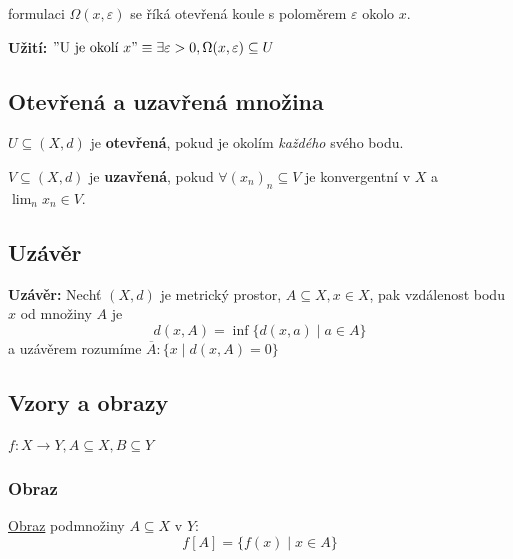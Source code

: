 \documentclass[../main.tex]{subfiles}
\begin{document}
formulaci $\Omega (x,\varepsilon)$ se říká otevřená koule s poloměrem $\varepsilon$ okolo $x$.
\vspace{5mm}

\noindent
\hspace{1.2mm}
\textbf{Užití:}
$"\textrm{U je okolí } x" \equiv \exists \varepsilon > 0, \Omega (x,\varepsilon) \subseteq U $

\subsection{Otevřená a uzavřená množina}
\hspace{1.2mm}
$U \subseteq (X,d)$ je \textbf{otevřená}, pokud je okolím \textit{každého} svého bodu.

\vspace{5mm}

\noindent
\hspace{1.2mm}
$V \subseteq (X,d)$ je \textbf{uzavřená}, pokud $\forall (x_n)_n \subseteq V$ je konvergentní
v $X$ a $\lim_n x_n \in V$.

\subsection{Uzávěr}
\hspace{1.2mm}
\textbf{Uzávěr:} Nechť $(X,d)$ je metrický prostor, $A \subseteq X, x\in X$, pak vzdálenost bodu $x$ od množiny $A$ je
\[d(x,A) = \inf\{d(x,a)\mid a \in A\}\]
a uzávěrem rozumíme $\overline{A} : \{x \mid d(x,A) = 0\}$

\subsection{Vzory a obrazy}
\hspace{1.2mm}
$f: X \rightarrow Y, A \subseteq X, B \subseteq Y$
\subsubsection{Obraz}
\hspace{1.2mm}
\underline{Obraz} podmnožiny $A\subseteq X$ v $Y$:
\[f[A] = \{f(x) \mid x \in A\}\]
\end{document}
